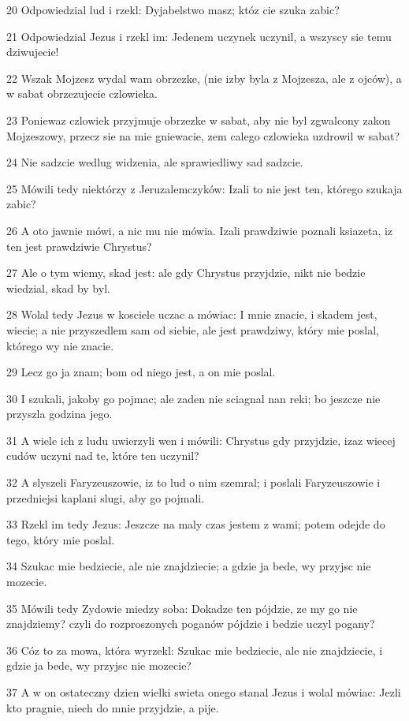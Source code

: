\par 20 Odpowiedzial lud i rzekl: Dyjabelstwo masz; któz cie szuka zabic?
\par 21 Odpowiedzial Jezus i rzekl im: Jedenem uczynek uczynil, a wszyscy sie temu dziwujecie!
\par 22 Wszak Mojzesz wydal wam obrzezke, (nie izby byla z Mojzesza, ale z ojców), a w sabat obrzezujecie czlowieka.
\par 23 Poniewaz czlowiek przyjmuje obrzezke w sabat, aby nie byl zgwalcony zakon Mojzeszowy, przecz sie na mie gniewacie, zem calego czlowieka uzdrowil w sabat?
\par 24 Nie sadzcie wedlug widzenia, ale sprawiedliwy sad sadzcie.
\par 25 Mówili tedy niektórzy z Jeruzalemczyków: Izali to nie jest ten, którego szukaja zabic?
\par 26 A oto jawnie mówi, a nic mu nie mówia. Izali prawdziwie poznali ksiazeta, iz ten jest prawdziwie Chrystus?
\par 27 Ale o tym wiemy, skad jest: ale gdy Chrystus przyjdzie, nikt nie bedzie wiedzial, skad by byl.
\par 28 Wolal tedy Jezus w kosciele uczac a mówiac: I mnie znacie, i skadem jest, wiecie; a nie przyszedlem sam od siebie, ale jest prawdziwy, który mie poslal, którego wy nie znacie.
\par 29 Lecz go ja znam; bom od niego jest, a on mie poslal.
\par 30 I szukali, jakoby go pojmac; ale zaden nie sciagnal nan reki; bo jeszcze nie przyszla godzina jego.
\par 31 A wiele ich z ludu uwierzyli wen i mówili: Chrystus gdy przyjdzie, izaz wiecej cudów uczyni nad te, które ten uczynil?
\par 32 A slyszeli Faryzeuszowie, iz to lud o nim szemral; i poslali Faryzeuszowie i przedniejsi kaplani slugi, aby go pojmali.
\par 33 Rzekl im tedy Jezus: Jeszcze na maly czas jestem z wami; potem odejde do tego, który mie poslal.
\par 34 Szukac mie bedziecie, ale nie znajdziecie; a gdzie ja bede, wy przyjsc nie mozecie.
\par 35 Mówili tedy Zydowie miedzy soba: Dokadze ten pójdzie, ze my go nie znajdziemy? czyli do rozproszonych poganów pójdzie i bedzie uczyl pogany?
\par 36 Cóz to za mowa, która wyrzekl: Szukac mie bedziecie, ale nie znajdziecie, i gdzie ja bede, wy przyjsc nie mozecie?
\par 37 A w on ostateczny dzien wielki swieta onego stanal Jezus i wolal mówiac: Jezli kto pragnie, niech do mnie przyjdzie, a pije.
